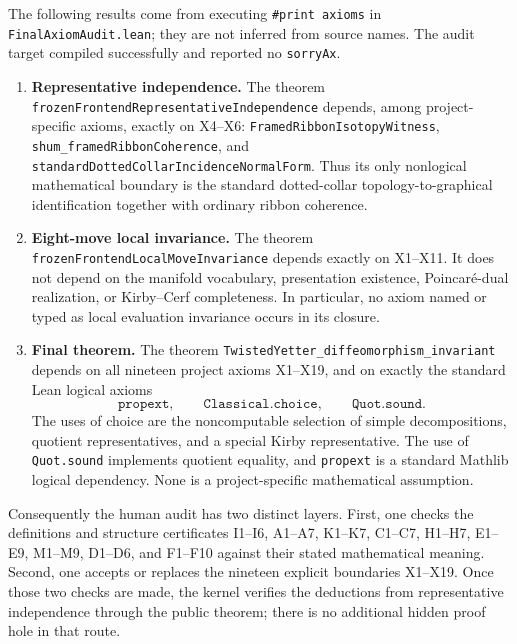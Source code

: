 The following results come from executing \texttt{\#print axioms} in
\nolinkurl{FinalAxiomAudit.lean}; they are not inferred from source names.
The audit target compiled successfully and reported no \texttt{sorryAx}.

\begin{enumerate}[label=\textbf{Q\arabic*.},leftmargin=*]

\item \textbf{Representative independence.}
The theorem \nolinkurl{frozenFrontendRepresentativeIndependence} depends, among
project-specific axioms, exactly on X4--X6:
\texttt{FramedRibbonIsotopyWitness},
\nolinkurl{shum_framedRibbonCoherence}, and
\nolinkurl{standardDottedCollarIncidenceNormalForm}.
Thus its only nonlogical mathematical boundary is the standard dotted-collar
topology-to-graphical identification together with ordinary ribbon coherence.

\item \textbf{Eight-move local invariance.}
The theorem \nolinkurl{frozenFrontendLocalMoveInvariance} depends exactly on
X1--X11.  It does not depend on the manifold vocabulary, presentation
existence, Poincar\'e-dual realization, or Kirby--Cerf completeness.  In
particular, no axiom named or typed as local evaluation invariance occurs in
its closure.

\item \textbf{Final theorem.}
The theorem \nolinkurl{TwistedYetter_diffeomorphism_invariant} depends on all
nineteen project axioms X1--X19, and on exactly the standard Lean logical
axioms
\[
 \texttt{propext},\qquad
 \texttt{Classical.choice},\qquad
 \texttt{Quot.sound}.
\]
The uses of choice are the noncomputable selection of simple decompositions,
quotient representatives, and a special Kirby representative.  The use of
\texttt{Quot.sound} implements quotient equality, and \texttt{propext} is a
standard Mathlib logical dependency.  None is a project-specific mathematical
assumption.

\end{enumerate}

Consequently the human audit has two distinct layers.  First, one checks the
definitions and structure certificates I1--I6, A1--A7, K1--K7, C1--C7,
H1--H7, E1--E9, M1--M9, D1--D6, and F1--F10 against their stated mathematical
meaning.  Second, one accepts or replaces the nineteen explicit boundaries
X1--X19.  Once those two checks are made, the kernel verifies the deductions
from representative independence through the public theorem; there is no
additional hidden proof hole in that route.
